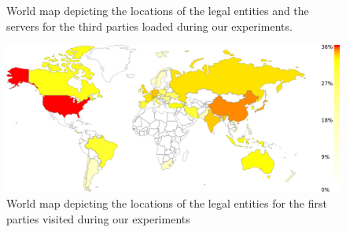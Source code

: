 \begin{figure}[!t]
 \centering
 
   \hfill
 
 \caption{World map depicting the locations of the legal entities and the servers for the third parties loaded during our experiments.}
 \label{fig:third_party_map}
\end{figure}

\begin{figure}
    \centering
    \includegraphics[width=\textwidth]{figures/first_party_entity_map.eps}
    \caption{World map depicting the locations of the legal entities for the first parties visited during our experiments}
    \label{fig:first_party_entity_map}
\end{figure}

